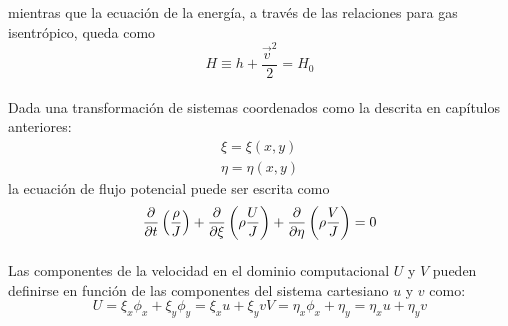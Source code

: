 \documentclass[letterpaper, openright, 12pt]{book}
\begin{document}
        mientras que la ecuación de la energía, a través de las relaciones
        para gas isentrópico, queda como
        \begin{equation}
            H \equiv h + \frac{\vec{v}^2}{2} = H_0
        \end{equation}

    \paragraph*{}
        Dada una transformación de sistemas coordenados como la descrita en
        capítulos anteriores:
        \begin{align*}
            \xi = \xi(x, y)
            \\
            \eta = \eta(x, y)
        \end{align*}
        la ecuación de flujo potencial puede ser escrita como
        \begin{equation}
            \pdv{t} \left( \frac{\rho}{J} \right) + \pdv{\xi} \left( \rho
                    \frac{U}{J} \right) + \pdv{\eta} \left( \rho \frac{V}{J}
                        \right) = 0
            \label{eq_potencial_0}
        \end{equation}

    \paragraph*{}
        Las componentes de la velocidad en el dominio computacional $U$ y $V$
        pueden definirse en función de las componentes del sistema cartesiano
        $u$ y $v$ como:
        \begin{subequations}
            \begin{equation}
                U = \xi_{x} \phi_{x} + \xi_{y} \phi_{y}
                        = \xi_{x} u + \xi_{y} v
            \end{equation}
            \begin{equation}
                V = \eta_{x} \phi_{x} + \eta_{y} = \eta_{x} u + \eta_{y} v
            \end{equation}
        \end{subequations}
\end{document}
